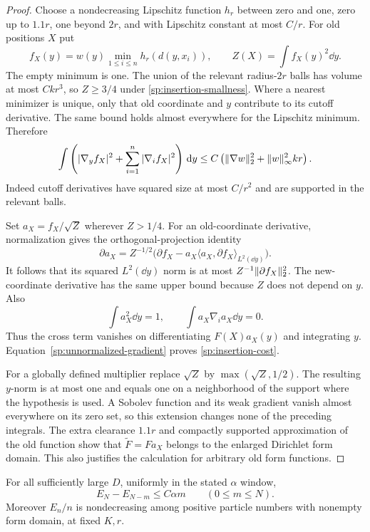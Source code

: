 \begin{proof}
Choose a nondecreasing Lipschitz function $h_r$ between zero and one, zero up to
$1.1r$, one beyond $2r$, and with Lipschitz constant at most $C/r$.
For old positions $X$ put
\[
 f_X(y)=w(y)\min_{1\le i\le n}h_r(d(y,x_i)),\qquad
 Z(X)=\int f_X(y)^2\dd y.
\]
The empty minimum is one.  The union of the relevant radius-$2r$ balls
has volume at most $Ckr^3$, so $Z\ge3/4$ under
\eqref{sp:insertion-smallness}.  Where a nearest minimizer is unique,
only that old coordinate and $y$ contribute to its cutoff derivative.
The same bound holds almost everywhere for the Lipschitz minimum.
Therefore
\begin{equation}\label{sp:unnormalized-gradient}
 \int\left(|\nabla_yf_X|^2+
              \sum_{i=1}^n|\nabla_if_X|^2\right)\,\mathrm d y
 \le C\left(\lVert\nabla w\rVert_2^2+\lVert w\rVert_\infty^2kr\right).
\end{equation}
Indeed cutoff derivatives have squared size at most $C/r^2$ and
are supported in the relevant balls.

Set $a_X=f_X/\sqrt Z$ wherever $Z>1/4$.  For an old-coordinate
derivative, normalization gives the orthogonal-projection identity
\[
 \partial a_X=Z^{-1/2}
       \bigl(\partial f_X-a_X\langle a_X,\partial f_X\rangle_{L^2(\dd y)}\bigr).
\]
It follows that its squared $L^2(\dd y)$ norm is at most
$Z^{-1}\lVert\partial f_X\rVert_2^2$.
The new-coordinate derivative has the same upper bound because $Z$
does not depend on $y$.  Also
\[
 \int a_X^2\dd y=1,
 \qquad\int a_X\nabla_i a_X\dd y=0.
\]
Thus the cross term vanishes on differentiating $F(X)a_X(y)$ and
integrating $y$.  Equation~\eqref{sp:unnormalized-gradient} proves
\eqref{sp:insertion-cost}.

For a globally defined multiplier replace $\sqrt Z$ by
$\max(\sqrt Z,1/2)$.  The resulting $y$-norm is at most one and
equals one on a neighborhood of the support where the hypothesis is
used.  A Sobolev function and its weak gradient vanish almost everywhere
on its zero set, so this extension changes none of the preceding integrals.
The extra clearance $1.1r$ and compactly supported approximation of the
old function show that $\widetilde F=Fa_X$ belongs to the enlarged
Dirichlet form domain.  This also justifies the calculation for arbitrary
old form functions.
\end{proof}

\begin{corollary}\label{sp:removal}
For all sufficiently large $D$, uniformly in the stated $\alpha$ window,
\begin{equation}\label{sp:removal-bound}
 E_N-E_{N-m}\le C\alpha m\qquad(0\le m\le N).
\end{equation}
Moreover $E_n/n$ is nondecreasing among positive particle numbers with
nonempty form domain, at fixed $K,r$.
\end{corollary}

